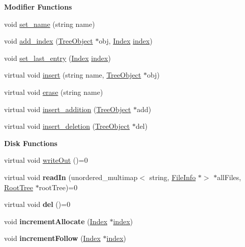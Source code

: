 \begin{Indent}\textbf{ Modifier Functions}\par
\begin{DoxyCompactItemize}
\item 
void \mbox{\hyperlink{classTreeObject_a8ae7e42502b4652102e0b3c4c4e1671b}{set\+\_\+name}} (string name)
\item 
void \mbox{\hyperlink{classTreeObject_af908239ff96a0f3064d0d8aefb58381b}{add\+\_\+index}} (\mbox{\hyperlink{classTreeObject}{Tree\+Object}} $\ast$obj, \mbox{\hyperlink{structindex}{Index}} \mbox{\hyperlink{structindex}{index}})
\item 
void \mbox{\hyperlink{classTreeObject_a2ec94bc9d2647275049ddf2a70b8510e}{set\+\_\+last\+\_\+entry}} (\mbox{\hyperlink{structindex}{Index}} \mbox{\hyperlink{structindex}{index}})
\item 
virtual void \mbox{\hyperlink{classTreeObject_af8cc57edba9f435b52ccf33cfbbb2fc6}{insert}} (string name, \mbox{\hyperlink{classTreeObject}{Tree\+Object}} $\ast$obj)
\item 
virtual void \mbox{\hyperlink{classTreeObject_a453b5df2a9ef7c6faad259900d574ee2}{erase}} (string name)
\item 
virtual void \mbox{\hyperlink{classTreeObject_a41ce6080e0df5adcea4b0a76d35af885}{insert\+\_\+addition}} (\mbox{\hyperlink{classTreeObject}{Tree\+Object}} $\ast$add)
\item 
virtual void \mbox{\hyperlink{classTreeObject_afcc4b3928d2b77ff080aa229a9706215}{insert\+\_\+deletion}} (\mbox{\hyperlink{classTreeObject}{Tree\+Object}} $\ast$del)
\end{DoxyCompactItemize}
\end{Indent}
\begin{Indent}\textbf{ Disk Functions}\par
\begin{DoxyCompactItemize}
\item 
virtual void \mbox{\hyperlink{classTreeObject_abf2bf88337bec961784b5dfeb9b795ed}{write\+Out}} ()=0
\item 
\mbox{\label{classTreeObject_a8247e79f2b4c1760649ac6f1af1c583f}} 
virtual void {\bfseries read\+In} (unordered\+\_\+multimap$<$ string, \mbox{\hyperlink{classFileInfo}{File\+Info}} $\ast$$>$ $\ast$all\+Files, \mbox{\hyperlink{classRootTree}{Root\+Tree}} $\ast$root\+Tree)=0
\item 
\mbox{\label{classTreeObject_af390b7479aa972888e594c07a85740b6}} 
virtual void {\bfseries del} ()=0
\item 
\mbox{\label{classTreeObject_a0660e393ded8a24c5a7e211ad7891de3}} 
void {\bfseries increment\+Allocate} (\mbox{\hyperlink{structindex}{Index}} $\ast$\mbox{\hyperlink{structindex}{index}})
\item 
\mbox{\label{classTreeObject_a1a58b541ca7c6d442c0fd7a0f587cfdc}} 
void {\bfseries increment\+Follow} (\mbox{\hyperlink{structindex}{Index}} $\ast$\mbox{\hyperlink{structindex}{index}})
\end{DoxyCompactItemize}
\end{Indent}
